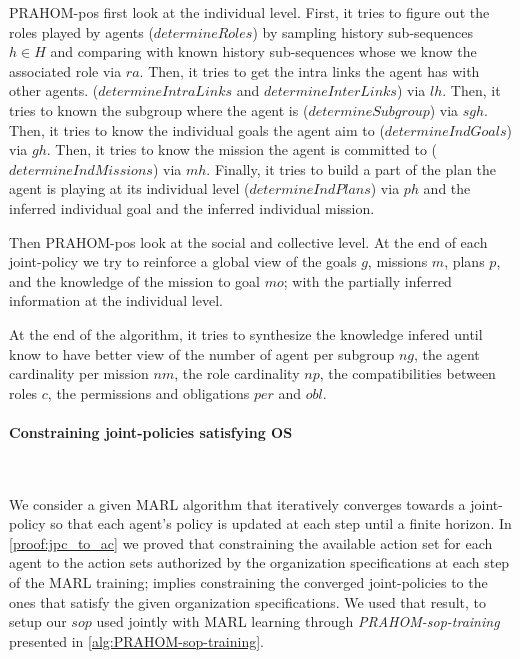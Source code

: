 \documentclass{ecai}
\newcounter{proof}
\begin{document}
PRAHOM-pos first look at the individual level.
First, it tries to figure out the roles played by agents ($determineRoles$) by sampling history sub-sequences $h \in H$ and comparing with known history sub-sequences whose we know the associated role via $ra$.
Then, it tries to get the intra links the agent has with other agents. ($determineIntraLinks$ and $determineInterLinks$) via $lh$.
Then, it tries to known the subgroup where the agent is ($determineSubgroup$) via $sgh$.
Then, it tries to know the individual goals the agent aim to ($determineIndGoals$) via $gh$.
Then, it tries to know the mission the agent is committed to ($determineIndMissions$) via $mh$.
Finally, it tries to build a part of the plan the agent is playing at its individual level ($determineIndPlans$) via $ph$ and the inferred individual goal and the inferred individual mission.

Then PRAHOM-pos look at the social and collective level.
At the end of each joint-policy we try to reinforce a global view of the goals $g$, missions $m$, plans $p$, and the knowledge of the mission to goal $mo$; with the partially inferred information at the individual level.

At the end of the algorithm, it tries to synthesize the knowledge infered until know to have better view of the number of agent per subgroup $ng$, the agent cardinality per mission $nm$, the role cardinality $np$, the compatibilities between roles $c$, the permissions and obligations $per$ and $obl$.


\paragraph{\textbf{Constraining joint-policies satisfying OS}}

\

We consider a given MARL algorithm that iteratively converges towards a joint-policy so that each agent's policy is updated at each step until a finite horizon. In \autoref{proof:jpc_to_ac} we proved that constraining the available action set for each agent to the action sets authorized by the organization specifications at each step of the MARL training; implies constraining the converged joint-policies to the ones that satisfy the given organization specifications. We used that result, to setup our $sop$ used jointly with MARL learning through \emph{PRAHOM-sop-training} presented in \autoref{alg:PRAHOM-sop-training}.

\end{document}
